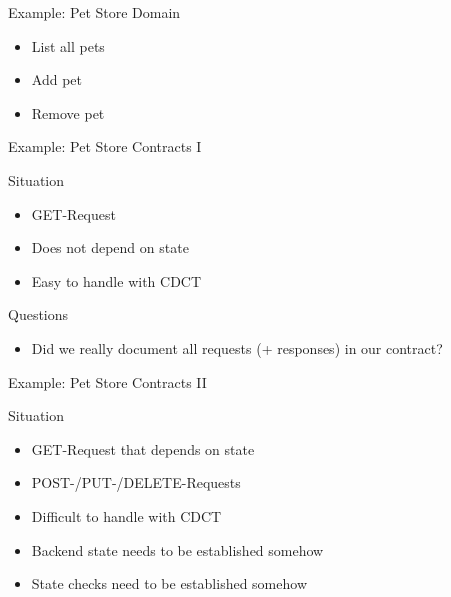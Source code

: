 \begin{frame}[fragile]{}
\end{frame}

\begin{frame}[fragile]{Example: Pet Store Domain}

\begin{itemize}
\item List all pets
\item Add pet
\item Remove pet
\end{itemize}

\end{frame}

\begin{frame}[fragile]{Example: Pet Store Contracts I}

  

\end{frame}


\begin{frame}[fragile]{Situation}

\begin{itemize}[<+->]
\item GET-Request
\item Does not depend on state
\item Easy to handle with CDCT
\end{itemize}
\end{frame}

\begin{frame}[fragile]{Questions}

\begin{itemize}[<+->]
\item Did we really document all requests (+ responses) in our contract?
\end{itemize}

\end{frame}


\begin{frame}[fragile]{Example: Pet Store Contracts II}

  

\end{frame}


\begin{frame}[fragile]{Situation}

\begin{itemize}[<+->]
\item GET-Request that depends on state
\item POST-/PUT-/DELETE-Requests
\item Difficult to handle with CDCT
\item Backend state needs to be established somehow
\item State checks need to be established somehow
\end{itemize}
\end{frame}


